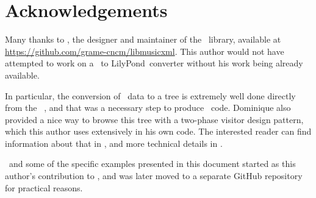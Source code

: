 
\chapter{Acknowledgements}



Many thanks to \fober, the designer and maintainer of the \libmusicxml\ library, available at \url{https://github.com/grame-cncm/libmusicxml}. This author would not have attempted to work on a \mxml\ to LilyPond\ converter without his work being already available.

In particular, the conversion of \mxml\ data to a tree is extremely well done directly from the \mxml\ \dtd, and that was a necessary step to produce \lily\ code. Dominique also provided a nice way to browse this tree with a two-phase visitor design pattern, which this author uses extensively in his own code. The interested reader can find information about that in , and more technical details in .

\xmlToLy\ and some of the specific examples presented in this document started as this author's contribution to \libmusicxml, and was later moved to a separate GitHub repository for practical reasons.

